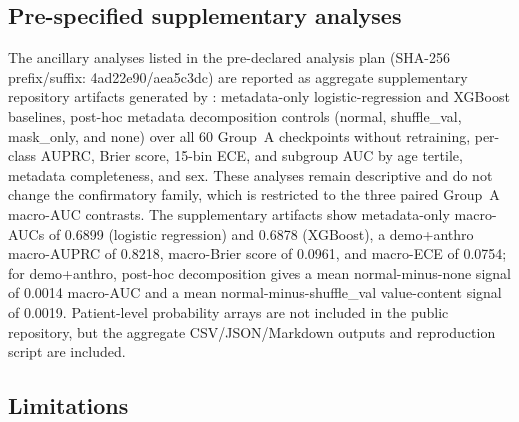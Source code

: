 \documentclass[mathematics,article,pdftex]{Definitions/mdpi}
\def\texttt#1{#1}%
\begin{document}
\subsection{Pre-specified supplementary analyses}
The ancillary analyses listed in the pre-declared analysis plan (SHA-256 prefix/suffix: \texttt{4ad22e90}/\texttt{aea5c3dc}) are reported as aggregate supplementary repository artifacts generated by : metadata-only logistic-regression and XGBoost baselines, post-hoc metadata decomposition controls (\texttt{normal}, \texttt{shuffle\_val}, \texttt{mask\_only}, and \texttt{none}) over all 60 Group~A checkpoints without retraining, per-class AUPRC, Brier score, 15-bin ECE, and subgroup AUC by age tertile, metadata completeness, and sex. These analyses remain descriptive and do not change the confirmatory family, which is restricted to the three paired Group~A macro-AUC contrasts. The supplementary artifacts show metadata-only macro-AUCs of 0.6899 (logistic regression) and 0.6878 (XGBoost), a \texttt{demo+anthro} macro-AUPRC of 0.8218, macro-Brier score of 0.0961, and macro-ECE of 0.0754; for \texttt{demo+anthro}, post-hoc decomposition gives a mean normal-minus-none signal of 0.0014 macro-AUC and a mean normal-minus-\texttt{shuffle\_val} value-content signal of 0.0019. Patient-level probability arrays are not included in the public repository, but the aggregate CSV/JSON/Markdown outputs and reproduction script are included.

\subsection{Limitations}\label{sec:limits}
\end{document}
